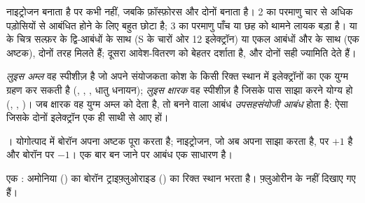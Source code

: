 \begin{remark}\label{rem:b1:lewis-resonance-vsepr:hypervalent}
नाइट्रोजन  बनाता है पर कभी  नहीं, जबकि फ़ॉस्फ़ोरस
 और  दोनों बनाता है।  2 का परमाणु चार से अधिक पड़ोसियों
से आबंधित होने के लिए बहुत छोटा है;  3 का परमाणु पाँच या छह को थामने लायक बड़ा है।
 या  के चित्र सल्फ़र के द्वि-आबंधों के साथ (S के चारों ओर 12
इलेक्ट्रॉन) या एकल आबंधों और  के साथ (एक अष्टक), दोनों तरह
मिलते हैं; दूसरा आवेश-वितरण को बेहतर दर्शाता है, और
दोनों सही ज्यामिति देते हैं।
\end{remark}

\begin{definition}[लुइस अम्ल, लुइस क्षारक, उपसहसंयोजी आबंध]\label{def:b1:lewis-resonance-vsepr:lewis-acid}
\emph{लुइस अम्ल} वह स्पीशीज़ है जो अपने संयोजकता कोश के
किसी रिक्त स्थान में इलेक्ट्रॉनों का एक युग्म ग्रहण कर सकती है (,
, , धातु धनायन); \emph{लुइस क्षारक}
वह स्पीशीज़ है जिसके पास साझा करने योग्य  हो (, ,
)। जब क्षारक वह युग्म अम्ल को देता है, तो बनने वाला आबंध
\emph{उपसहसंयोजी आबंध} होता है: ऐसा  जिसके दोनों
इलेक्ट्रॉन एक ही साथी से आए हों।
\end{definition}

\begin{example}[अमोनिया और बोरॉन ट्राइफ़्लुओराइड]\label{ex:b1:lewis-resonance-vsepr:adduct}
। योगोत्पाद में बोरॉन अपना अष्टक पूरा करता है;
नाइट्रोजन, जो अब अपना  साझा करता है, पर 
$+1$ है और बोरॉन पर $-1$। एक बार बन जाने पर  आबंध एक साधारण
 है।
\end{example}

\begin{omfigure}

{\small एक : अमोनिया () का 
बोरॉन ट्राइफ़्लुओराइड () का रिक्त स्थान भरता है। फ़्लुओरीन के 
नहीं दिखाए गए हैं।}
\end{omfigure}

